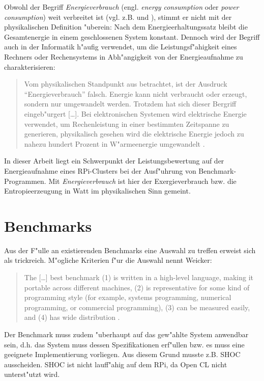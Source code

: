 Obwohl der Begriff \textit{Energieverbrauch} (engl. \textit{energy consumption} oder \textit{power consumption}) weit verbreitet ist (vgl. z.B. \cite{fich13} und \cite{buh08}), stimmt er nicht mit der physikalischen Definition "uberein: Nach dem Energieerhaltungssatz bleibt die Gesamtenergie in einem geschlossenen System konstant. Dennoch wird der Begriff auch in der Informatik h"aufig verwendet, um die Leistungsf"ahigkeit eines Rechners oder Rechensystems in Abh"angigkeit von der Energieaufnahme zu charakterisieren:
\begin{quote}
\onehalfspacing
Vom physikalischen Standpunkt aus betrachtet, ist der Ausdruck "`Energieverbrauch"' falsch. Energie kann nicht verbraucht oder erzeugt, sondern nur umgewandelt werden. Trotzdem hat sich dieser Bergriff eingeb"urgert [\dots]. Bei elektronischen Systemen wird elektrische Energie verwendet, um Rechenleistung in einer bestimmten Zeitspanne zu generieren, physikalisch gesehen wird die elektrische Energie jedoch zu nahezu hundert Prozent in W"armeenergie umgewandelt \cite{lan13}. 
\end{quote}
In dieser Arbeit liegt ein Schwerpunkt der Leistungsbewertung auf der Energieaufnahme eines RPi-Clusters bei der Ausf"uhrung von Benchmark-Programmen. Mit \textit{Energieverbrauch} ist hier der Exergieverbrauch bzw. die Entropieerzeugung in Watt im physikalischen Sinn gemeint.     

\section{Benchmarks}\label{Benchmarks}

Aus der F"ulle an existierenden Benchmarks eine Auswahl zu treffen erweist sich als trickreich. M"ogliche Kriterien f"ur die Auswahl nennt Weicker: 
\begin{quote}
\onehalfspacing
The [\dots] best benchmark (1) is written in a high-level language, making it portable across different machines, (2) is representative for some kind of programming style (for example, systems programming, numerical programming, or commercial programming), (3) can be measured easily, and (4) has wide distribution \cite{wei90}. 
\end{quote}
Der Benchmark muss zudem "uberhaupt auf das gew"ahlte System anwendbar sein, d.h. das System muss dessen Spezifikationen erf"ullen bzw. es muss eine geeignete Implementierung vorliegen. Aus diesem Grund musste z.B. SHOC ausscheiden. SHOC ist nicht lauff"ahig auf dem RPi, da Open CL nicht unterst"utzt wird. 

